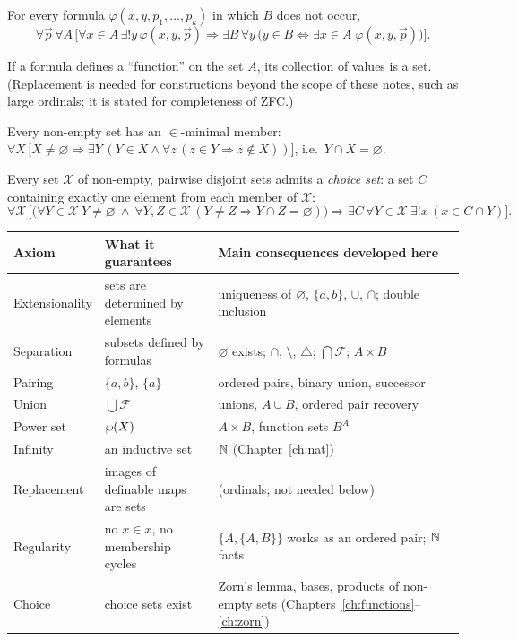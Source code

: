 \begin{axiom}\label{ax:repl}
	For every formula $\varphi(x,y,p_1,\dots,p_k)$ in which $B$ does not occur,
	\[
	\forall\vec p\,\forall A\,\bigl[\forall x\in A\,\exists!y\,\varphi(x,y,\vec p)\Rightarrow\exists B\,\forall y\,\bigl(y\in B\Leftrightarrow\exists x\in A\;\varphi(x,y,\vec p)\bigr)\bigr].
	\]
\end{axiom}
If a formula defines a ``function'' on the set $A$, its collection of values is a set. (Replacement is needed for constructions beyond the scope of these notes, such as large ordinals; it is stated for completeness of ZFC.)

\begin{axiom}\label{ax:reg}
	Every non-empty set has an $\in$-minimal member:
	$\forall X\,\bigl[X\neq\varnothing\Rightarrow\exists Y\,(Y\in X\wedge\forall z\,(z\in Y\Rightarrow z\notin X))\bigr]$, i.e.\ $Y\cap X=\varnothing$.
\end{axiom}

\begin{axiom}[Choice]\label{ax:choice}
	Every set $\mathcal X$ of non-empty, pairwise disjoint sets admits a \emph{choice set}: a set $C$ containing exactly one element from each member of $\mathcal X$:
	\[
	\forall\mathcal X\,\bigl[\bigl(\forall Y\in\mathcal X\ Y\ne\varnothing\ \wedge\ \forall Y,Z\in\mathcal X\,(Y\ne Z\Rightarrow Y\cap Z=\varnothing)\bigr)\Rightarrow\exists C\,\forall Y\in\mathcal X\ \exists!x\,(x\in C\cap Y)\bigr].
	\]
\end{axiom}

\begin{center}
	\begin{tabular}{@{}p{2.8cm}p{5.4cm}p{6.4cm}@{}}
		\toprule
		\textbf{Axiom} & \textbf{What it guarantees} & \textbf{Main consequences developed here}\\
		\midrule
		Extensionality & sets are determined by elements & uniqueness of $\varnothing$, $\{a,b\}$, $\cup$, $\cap$; double inclusion\\
		Separation & subsets defined by formulas & $\varnothing$ exists; $\cap$, $\setminus$, $\triangle$; $\bigcap\mathcal F$; $A\times B$\\
		Pairing & $\{a,b\}$, $\{a\}$ & ordered pairs, binary union, successor\\
		Union & $\bigcup\mathcal F$ & unions, $A\cup B$, ordered pair recovery\\
		Power set & $\wp(X)$ & $A\times B$, function sets $B^A$\\
		Infinity & an inductive set & $\mathbb{N}$ (Chapter~\ref{ch:nat})\\
		Replacement & images of definable maps are sets & (ordinals; not needed below)\\
		Regularity & no $x\in x$, no membership cycles & $\{A,\{A,B\}\}$ works as an ordered pair; $\mathbb{N}$ facts\\
		Choice & choice sets exist & Zorn's lemma, bases, products of non-empty sets (Chapters~\ref{ch:functions}--\ref{ch:zorn})\\
		\bottomrule
	\end{tabular}
\end{center}


